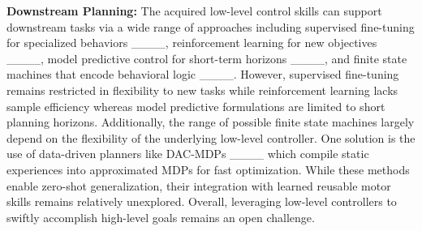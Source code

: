 \textbf{Downstream Planning:} 
The acquired low-level control skills can support downstream tasks via a wide range of approaches including supervised fine-tuning for specialized behaviors ____,  reinforcement learning for new objectives ____,  model predictive control for short-term horizons ____, and finite state machines that encode behavioral logic ____. However, supervised fine-tuning remains restricted in flexibility to new tasks while reinforcement learning lacks sample efficiency whereas model predictive formulations are limited to short planning horizons. Additionally, the range of possible finite state machines largely depend on the flexibility of the underlying low-level controller. One solution is the use of data-driven planners like DAC-MDPs ____ which compile static experiences into approximated MDPs for fast optimization. While these methods enable zero-shot generalization, their integration with learned reusable motor skills remains relatively unexplored. Overall, leveraging low-level controllers to swiftly accomplish high-level goals remains an open challenge.